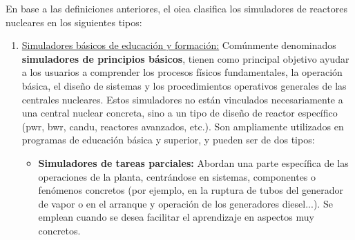 En base a las definiciones anteriores, el \acrshort{oiea} clasifica los simuladores de reactores nucleares en los siguientes tipos:

\begin{enumerate}
  \item \underline{Simuladores básicos de educación y formación:} Comúnmente denominados \textbf{simuladores de principios básicos}, tienen como principal objetivo ayudar a los usuarios a comprender los procesos físicos fundamentales, la operación básica, el diseño de sistemas y los procedimientos operativos generales de las centrales nucleares. Estos simuladores no están vinculados necesariamente a una central nuclear concreta, sino a un tipo de diseño de reactor específico (\acrshort{pwr}, \acrshort{bwr}, \acrfull{candu}, reactores avanzados, etc.). Son ampliamente utilizados en programas de educación básica y superior, y pueden ser de dos tipos:
  \begin{itemize}
    \item \textbf{Simuladores de tareas parciales:} Abordan una parte específica de las operaciones de la planta, centrándose en sistemas, componentes o fenómenos concretos (por ejemplo, en la ruptura de tubos del generador de vapor o en el arranque y operación de los generadores diesel...). Se emplean cuando se desea facilitar el aprendizaje en aspectos muy concretos.
    

\end{itemize}
\end{enumerate}

